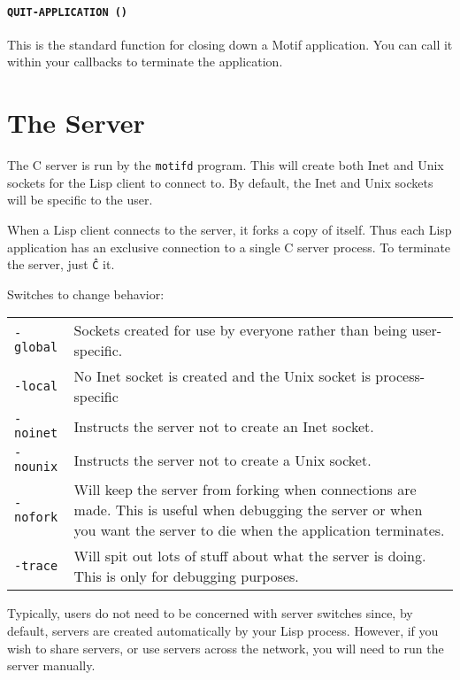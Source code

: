 \documentclass[a4paper]{article}
\begin{document}
\paragraph{\texttt{QUIT-APPLICATION ()}} This is the standard function
for closing down a Motif application.  You can call it within your
callbacks to terminate the application.


\section{The Server}

The C server is run by the \texttt{motifd} program.  This will create
both Inet and Unix sockets for the Lisp client to connect to.  By
default, the Inet and Unix sockets will be specific to the user.

When a Lisp client connects to the server, it forks a copy of itself.
Thus each Lisp application has an exclusive connection to a single C
server process.  To terminate the server, just \texttt{\^C} it.

\noindent
Switches to change behavior:\\[2mm]
\begin{tabular}{lp{}}
\texttt{-global} & Sockets created for use by everyone rather than
	           being user-specific.\\
\texttt{-local } & No Inet socket is created and the Unix socket is
	           process-specific\\
\texttt{-noinet} & Instructs the server not to create an Inet socket.\\
\texttt{-nounix} & Instructs the server not to create a Unix socket.\\
\texttt{-nofork} & Will keep the server from forking when connections are
	           made.  This is useful when debugging the server or when
	           you want the server to die when the application
	           terminates.\\
\texttt{-trace}  & Will spit out lots of stuff about what the server is
	           doing.  This is only for debugging purposes.
\end{tabular}

\vspace{2mm}
	
Typically, users do not need to be concerned with server switches
since, by default, servers are created automatically by your Lisp
process.  However, if you wish to share servers, or use servers across
the network, you will need to run the server manually.
\end{document}

